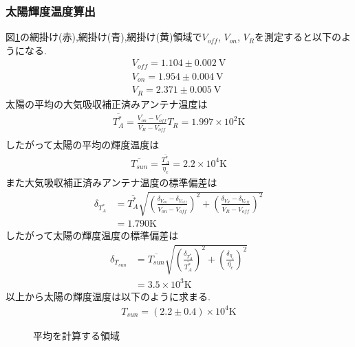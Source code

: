 \subsubsection{太陽輝度温度算出}
図\ref{fig:solar_radio_Temp}の網掛け(赤),網掛け(青),網掛け(黄)領域で$V_{off}$, $V_{on}$, $V_R$を測定すると以下のようになる.
\begin{align}
  V_{off}=1.104\pm0.002\ \si{\volt}\\
  V_{on}=1.954\pm0.004\ \si{\volt}\\
  V_{R}=2.371\pm0.005\ \si{\volt}
\end{align}
太陽の平均の大気吸収補正済みアンテナ温度は
\begin{align}
  \overline{T_A^{*}}=\frac{\overline{V_{on}}-\overline{V_{off}}}{\overline{V_R}-\overline{V_{off}}}{T_R}=1.997\times10^2\si{\kelvin}\\
\end{align}
したがって太陽の平均の輝度温度は
\begin{align}
  \overline{T_{sun}}=\frac{\overline{T_A^{*}}}{\overline{\eta_c}}=2.2\times10^4\si{\kelvin}
\end{align}
また大気吸収補正済みアンテナ温度の標準偏差は
\begin{align}
  \delta_{T_A^{*}}&=\overline{T_A^{*}}\sqrt{\left(\frac{\delta_{V_{on}}-\delta_{V_{off}}}{\overline{V_{on}}-\overline{V_{off}}}\right)^2+\left(\frac{\delta_{V_{R}}-\delta_{V_{off}}}{\overline{V_{R}}-\overline{V_{off}}}\right)^2}\nonumber\\
  &=1.790\si{\kelvin}\nonumber
\end{align}
したがって太陽の輝度温度の標準偏差は
\begin{align}
  \delta_{T_{sun}}&=\overline{T_{sun}}\sqrt{\left(\frac{\delta_{T_A^{*}}}{\overline{T_A^{*}}}\right)^2+\left(\frac{\delta_{\eta_c}}{\overline{\eta_c}}\right)^2}\nonumber\\
  &=3.5\times10^3\si{\kelvin}
\end{align}
以上から太陽の輝度温度は以下のように求まる.
\begin{align}
  T_{sun}=(2.2\pm0.4)\times10^4\si{\kelvin}
\end{align}
\begin{figure}[hptb]
\begin{center}

\caption{平均を計算する領域}
\label{fig:solar_radio_Temp}
\end{center}
\end{figure}